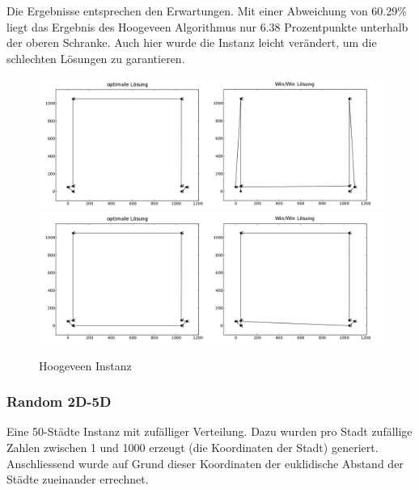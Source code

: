 \documentclass[11pt,a4paper]{article}
\begin{document}
Die Ergebnisse entsprechen den Erwartungen. Mit einer Abweichung von 60.29\% liegt das Ergebnis des Hoogeveen Algorithmus nur 6.38 Prozentpunkte unterhalb der oberen Schranke. Auch hier wurde die Instanz leicht verändert, um die schlechten Lösungen zu garantieren.

\begin{figure}[H]
        \centering
        \includegraphics[width=15cm]{gfx/hoogeveen_hpp_comparison}
        \includegraphics[width=15cm]{gfx/hoogeveen_tsp_comparison}
        \caption{Hoogeveen Instanz}
        \label{img:hoogeveen_comparison}
\end{figure}

\subsubsection{Random 2D-5D}
Eine 50-Städte Instanz mit zufälliger Verteilung. Dazu wurden pro Stadt zufällige Zahlen zwischen 1 und 1000 erzeugt (die Koordinaten der Stadt) generiert. Anschliessend wurde auf Grund dieser Koordinaten der euklidische Abstand der Städte zueinander errechnet.
\end{document}
